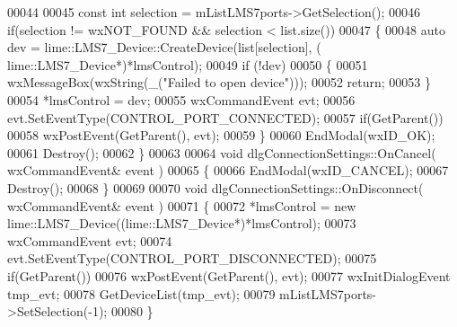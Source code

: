 \begin{DoxyCode}
00044 
00045     \textcolor{keyword}{const} \textcolor{keywordtype}{int} selection = mListLMS7ports->GetSelection();
00046     \textcolor{keywordflow}{if}(selection != wxNOT\_FOUND && selection < list.size())
00047     \{
00048         \textcolor{keyword}{auto} dev = lime::LMS7_Device::CreateDevice(list[selection], (
      lime::LMS7_Device*)*lmsControl);
00049         \textcolor{keywordflow}{if} (!dev)
00050         \{
00051             wxMessageBox(wxString(\_(\textcolor{stringliteral}{"Failed to open device"})));
00052             \textcolor{keywordflow}{return};
00053         \}
00054         *lmsControl = dev;
00055         wxCommandEvent evt;
00056         evt.SetEventType(CONTROL\_PORT\_CONNECTED);
00057         \textcolor{keywordflow}{if}(GetParent())
00058             wxPostEvent(GetParent(), evt);
00059     \}
00060     EndModal(wxID\_OK);
00061     Destroy();
00062 \}
00063 
00064 \textcolor{keywordtype}{void} dlgConnectionSettings::OnCancel( wxCommandEvent& event )
00065 \{
00066     EndModal(wxID\_CANCEL);
00067     Destroy();
00068 \}
00069 
00070 \textcolor{keywordtype}{void} dlgConnectionSettings::OnDisconnect( wxCommandEvent& event )
00071 \{
00072     *lmsControl = \textcolor{keyword}{new} lime::LMS7_Device((lime::LMS7_Device*)*lmsControl);
00073     wxCommandEvent evt;
00074     evt.SetEventType(CONTROL\_PORT\_DISCONNECTED);
00075     \textcolor{keywordflow}{if}(GetParent())
00076         wxPostEvent(GetParent(), evt);
00077     wxInitDialogEvent tmp\_evt;
00078     GetDeviceList(tmp\_evt);
00079     mListLMS7ports->SetSelection(-1);
00080 \}
\end{DoxyCode}
